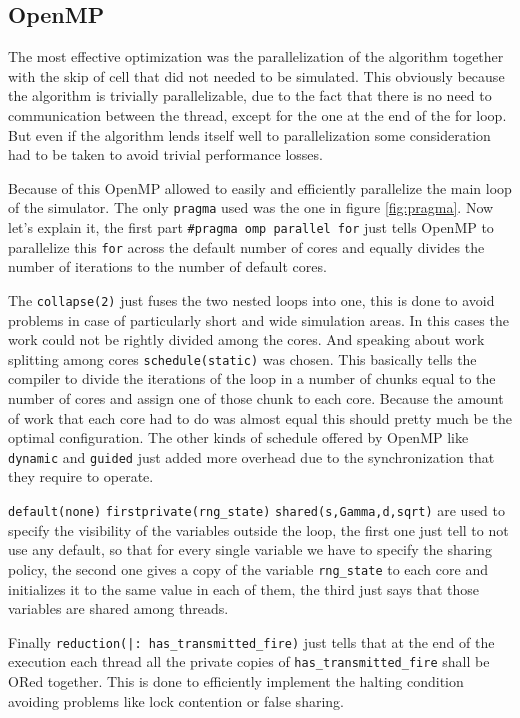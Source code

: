 \documentclass[Lau]{sapthesis} %
\let\oldsection\section
\let\oldsubsection\subsection
\def\subsubsection{\oldsubsection}
\def\subsection{\oldsection}
\def\section{\chapter}
\begin{document}
\subsubsection{OpenMP}

The most effective optimization was the parallelization of the algorithm
together with the skip of cell that did not needed to be simulated. This
obviously because the algorithm is trivially parallelizable, due to the fact
that there is no need to communication between the thread, except for the one at
the end of the for loop. But even if the algorithm lends itself well to
parallelization some consideration had to be taken to avoid trivial performance
losses.

Because of this OpenMP allowed to easily and efficiently parallelize the main
loop of the simulator. The only \texttt{pragma} used was the one in figure
\ref{fig:pragma}. Now let's explain it, the first part \verb+#pragma omp parallel for+
just tells OpenMP to parallelize this \texttt{for} across the default number of
cores and equally divides the number of iterations to the number of default
cores.

The \texttt{collapse(2)} just fuses the two nested loops into one, this is done
to avoid problems in case of particularly short and wide simulation areas. In
this cases the work could not be rightly divided among the cores. And speaking
about work splitting among cores \texttt{schedule(static)} was chosen. This
basically tells the compiler to divide the iterations of the loop in a number of
chunks equal to the number of cores and assign one of those chunk to each core.
Because the amount of work that each core had to do was almost equal this should
pretty much be the optimal configuration. The other kinds of schedule offered by
OpenMP like \texttt{dynamic} and \texttt{guided} just added more overhead due to
the synchronization that they require to operate.

\verb+default(none)+ \verb+firstprivate(rng_state)+ \verb+shared(s,Gamma,d,sqrt)+
are used to specify the visibility of the variables outside the loop, the first
one just tell to not use any default, so that for every single variable we have
to specify the sharing policy, the second one gives a copy of the variable
\verb+rng_state+ to each core and initializes it to the same value in each of
them, the third just says that those variables are shared among threads.

Finally \verb+reduction(|: has_transmitted_fire)+ just tells that at the end of
the execution each thread all the private copies of \verb+has_transmitted_fire+
shall be ORed together. This is done to efficiently implement the halting
condition avoiding problems like lock contention or false sharing.
\end{document}
